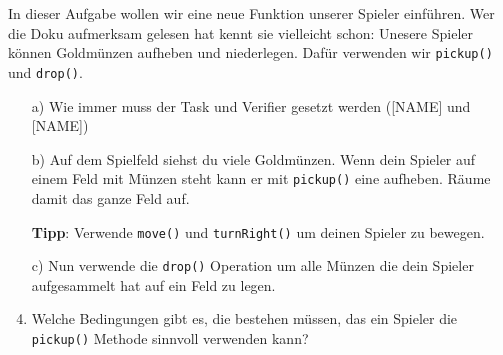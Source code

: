 
In dieser Aufgabe wollen wir eine neue Funktion unserer Spieler einführen. 
Wer die Doku aufmerksam gelesen hat kennt sie vielleicht schon: 
Unesere Spieler können Goldmünzen aufheben und niederlegen. 
Dafür verwenden wir \lstinline{pickup()} und \lstinline{drop()}.

\begin{enumerate}
    \item[a)] Wie immer muss der Task und Verifier gesetzt werden ([NAME] und [NAME])
    \item[b)] Auf dem Spielfeld siehst du viele Goldmünzen.
    Wenn dein Spieler auf einem Feld mit Münzen steht kann er mit \lstinline{pickup()} eine aufheben.
    Räume damit das ganze Feld auf.
    
    \textbf{Tipp}: Verwende \lstinline{move()} und \lstinline{turnRight()} um deinen Spieler zu bewegen.

    \item[c)] Nun verwende die \lstinline{drop()} Operation um alle Münzen die dein Spieler aufgesammelt hat auf ein Feld zu legen.
    \item[d)] Welche Bedingungen gibt es, die bestehen müssen, das ein Spieler die \lstinline{pickup()} Methode sinnvoll verwenden kann? 
\end{enumerate}